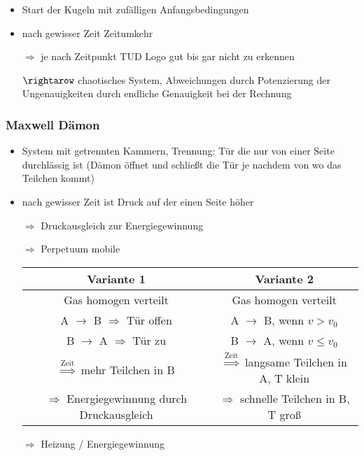 \begin{itemize}
\begin{itemize}
\begin{center}
        \end{center}
        \item Start der Kugeln mit zufälligen Anfangsbedingungen
        \item nach gewisser Zeit Zeitumkehr
        \item[$\Rightarrow$] je nach Zeitpunkt TUD Logo gut bis gar nicht zu erkennen
        \item[$\rightarow$] chaotisches System, Abweichungen durch Potenzierung der Ungenauigkeiten durch endliche Genauigkeit bei der Rechnung 
    \end{itemize}
\end{itemize}

\subsubsection{Maxwell Dämon}
\begin{itemize}
    \item System mit getrennten Kammern, Trennung: Tür die nur von einer Seite durchlässig ist (Dämon öffnet und schließt die Tür je nachdem von wo das Teilchen kommt)
    \item nach gewisser Zeit ist Druck auf der einen Seite höher
    \item[$\Rightarrow$] Druckausgleich zur Energiegewinnung
    \item[$\Rightarrow$] Perpetuum mobile 
\begin{table}[h]
    \centering
    \begin{tabular}{c|c}
        Variante 1 & Variante 2 \\ \hline
        Gas homogen verteilt & Gas homogen verteilt \\
        A $\rightarrow$ B $\Rightarrow$ Tür offen & A $\rightarrow$ B, wenn $v > v_0$ \\
        B $\rightarrow$ A $\Rightarrow$ Tür zu & B $\rightarrow$ A, wenn $v \leq v_0$ \\
        $\stackrel{\text{Zeit}}{\Rightarrow}$ mehr Teilchen in B & $\stackrel{\text{Zeit}}{\Rightarrow}$ langsame Teilchen in A, T klein \\
        $\Rightarrow$ Energiegewinnung durch Druckausgleich & $\Rightarrow$ schnelle Teilchen in B, T groß
    \end{tabular}
    \label{tab:Maxwell Dämon}
\end{table}
    \item[$\Rightarrow$] Heizung / Energiegewinnung
\end{itemize}

